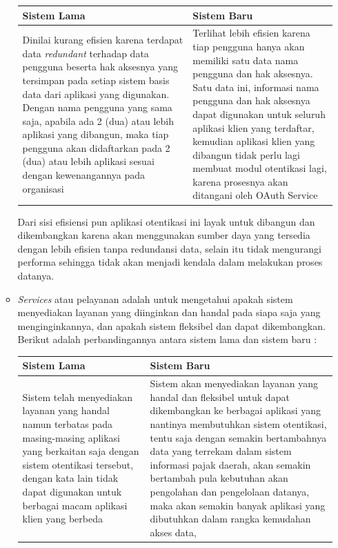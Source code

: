 \documentclass[pdftex,12pt, oneside]{article}
\begin{document}
\begin{enumerate}
\begin{itemize}
\begin{table}[H]
	\centering
	\begin{tabular}{| p{7cm} | p{7cm} |}
		\hline
		Sistem Lama & Sistem Baru \\
		\hline
		Dinilai kurang efisien karena terdapat data \textit{redundant} terhadap data pengguna beserta hak aksesnya yang tersimpan pada setiap sistem basis data dari aplikasi yang digunakan. Dengan nama pengguna yang sama saja, apabila ada 2 (dua) atau lebih aplikasi yang dibangun, maka tiap pengguna akan didaftarkan pada 2 (dua) atau lebih aplikasi sesuai dengan kewenangannya pada organisasi & Terlihat lebih efisien karena tiap pengguna hanya akan memiliki satu data nama pengguna dan hak aksesnya. Satu data ini, informasi nama pengguna dan hak aksesnya dapat digunakan untuk seluruh aplikasi klien yang terdaftar, kemudian aplikasi klien yang dibangun tidak perlu lagi membuat modul otentikasi lagi, karena prosesnya akan ditangani oleh OAuth Service \\
		\hline
	\end{tabular}
\end{table}

Dari sisi efisiensi pun aplikasi otentikasi ini layak untuk dibangun dan dikembangkan karena akan menggunakan sumber daya yang tersedia dengan lebih efisien tanpa redundansi data, selain itu tidak mengurangi performa sehingga tidak akan menjadi kendala dalam melakukan proses datanya.

\item \textit{Services} atau pelayanan adalah untuk mengetahui apakah sistem menyediakan layanan yang diinginkan dan handal pada siapa saja yang menginginkannya, dan apakah sistem fleksibel dan dapat dikembangkan. Berikut adalah perbandingannya antara sistem lama dan sistem baru :

\begin{table}[H]
	\centering
	\begin{tabular}{| p{7cm} | p{7cm} |}
		\hline
		Sistem Lama & Sistem Baru \\
		\hline
		Sistem telah menyediakan layanan yang handal namun terbatas pada masing-masing aplikasi yang berkaitan saja dengan sistem otentikasi tersebut, dengan kata lain tidak dapat digunakan untuk berbagai macam aplikasi klien yang berbeda & Sistem akan menyediakan layanan yang handal dan fleksibel untuk dapat dikembangkan ke berbagai aplikasi yang nantinya membutuhkan sistem otentikasi, tentu saja dengan semakin bertambahnya data yang terrekam dalam sistem informasi pajak daerah, akan semakin bertambah pula kebutuhan akan pengolahan dan pengelolaan datanya, maka akan semakin banyak aplikasi yang dibutuhkan dalam rangka kemudahan akses data,  \\
		\hline
	\end{tabular}
\end{table}


\end{itemize}
\end{enumerate}
\end{document}
